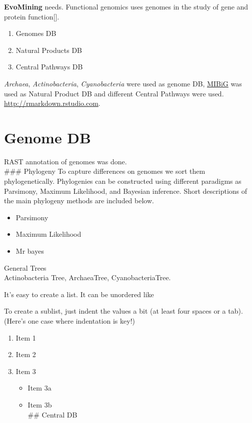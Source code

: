 \documentclass[12pt,twoside]{reedthesis}
\providecommand{\tightlist}{%
  \setlength{\itemsep}{0pt}\setlength{\parskip}{0pt}}
\begin{document}
  \textbf{EvoMining} needs. Functional genomics uses genomes in the study
  of gene and protein function{[}{]}.
  
  \begin{enumerate}
  \def\labelenumi{\arabic{enumi}.}
  \tightlist
  \item
    Genomes DB
  \item
    Natural Products DB
  \item
    Central Pathways DB
  \end{enumerate}
  
  \emph{Archaea}, \emph{Actinobacteria}, \emph{Cyanobacteria} were used as
  genome DB, \href{http://mibig.secondarymetabolites.org/}{MIBiG} was used
  as Natural Product DB and different Central Pathways were used.
  \url{http://rmarkdown.rstudio.com}.
  
  \section{Genome DB}\label{genome-db}
  
  RAST annotation of genomes was done.\\
  \#\#\# Phylogeny To capture differences on genomes we sort them
  phylogenetically. Phylogenies can be constructed using different
  paradigms as Parsimony, Maximum Likelihood, and Bayesian inference.
  Short descriptions of the main phylogeny methods are included below.
  
  \begin{itemize}
  \tightlist
  \item
    Parsimony
  \item
    Maximum Likelihood
  \item
    Mr bayes
  \end{itemize}
  
  General Trees\\
  Actinobacteria Tree, ArchaeaTree, CyanobacteriaTree.
  
  It's easy to create a list. It can be unordered like
  
  To create a sublist, just indent the values a bit (at least four spaces
  or a tab). (Here's one case where indentation is key!)
  
  \begin{enumerate}
  \def\labelenumi{\arabic{enumi}.}
  \tightlist
  \item
    Item 1
  \item
    Item 2
  \item
    Item 3
  
    \begin{itemize}
    \tightlist
    \item
      Item 3a
    \item
      Item 3b\\
      \#\# Central DB
    \end{itemize}
  \end{enumerate}
  
\end{document}
